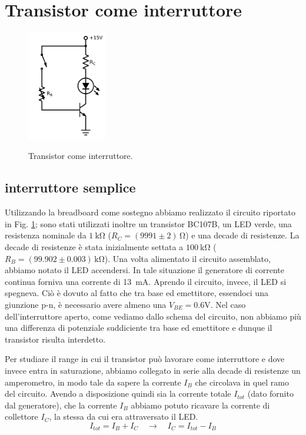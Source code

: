 \section{Transistor come interruttore}

\begin{figure}
	\caption{Transistor come interruttore.}
	\includegraphics[width=35mm]{cc1.pdf}
	\label{fig:cc1}
\end{figure}

\subsection{interruttore semplice}
Utilizzando la breadboard come sostegno abbiamo realizzato il circuito riportato in Fig. \ref{fig:cc1}; sono stati utilizzati inoltre un transistor BC107B, un LED verde, una resistenza nominale da $\SI{1}{\kilo\ohm}$ ($R_C =(9991 \pm 2)\, \si{\ohm}$) e una decade di resistenze. La decade di resistenze è stata inizialmente settata a $\SI{100}{\kilo\ohm}$ ($R_B = (99.902 \pm 0.003)\,\si{\kilo\ohm}$).
Una volta alimentato il circuito assemblato, abbiamo notato il LED accendersi. In tale situazione il generatore di corrente continua forniva una corrente di \SI{13}{\milli\ampere}. Aprendo il circuito, invece, il LED si spegneva. Ciò è dovuto al fatto che tra base ed emettitore, essendoci una giunzione p-n, è necessario avere almeno una $V_{BE}=0.6 \si{\volt}$. Nel caso dell'interruttore aperto, come vediamo dallo schema del circuito, non abbiamo più una differenza di potenziale suddiciente tra base ed emettitore e dunque il transistor risulta interdetto. 

Per studiare il range in cui il transistor può lavorare come interruttore e dove invece entra in saturazione, abbiamo collegato in serie alla decade di resistenze un amperometro, in modo tale da sapere la corrente $I_B$ che circolava in quel ramo del circuito. Avendo a disposizione quindi sia la corrente totale $I_{tot}$ (dato fornito dal generatore), che la corrente $I_B$ abbiamo potuto ricavare la corrente di collettore $I_C$, la stessa da cui era attraversato il LED.
\begin{equation*}
	I_{tot} = I_B + I_C \quad \rightarrow \quad I_C = I_{tot} - I_B
\end{equation*}

